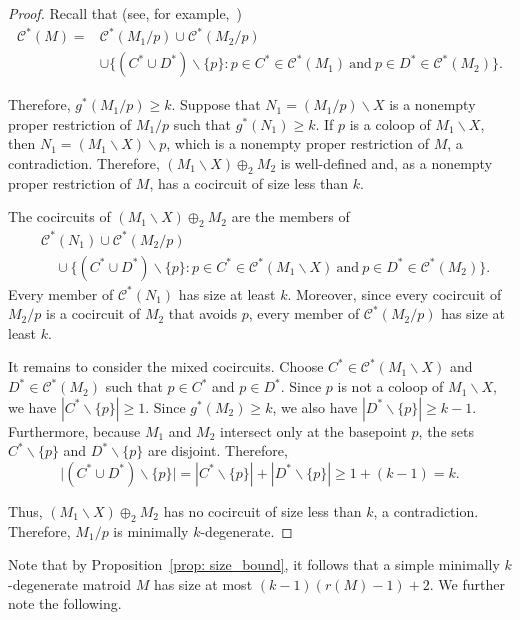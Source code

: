 \documentclass{amsart}
\newcommand{\ba}{\backslash}
\newcommand{\cC}{\mathcal{C}}
\theoremstyle{definition}
\theoremstyle{remark}
\numberwithin{equation}{section}
\begin{document}
\begin{proof}
    Recall that (see, for example,~\cite[Proposition~7.1.20]{Oxl11})
    \begin{align*}
        \cC^*(M)
        ={}&\cC^*(M_1/p)\cup\cC^*(M_2/p)\\
        &\cup\bigl\{(C^*\cup D^*)\backslash\{p\}:
        p\in C^*\in\cC^*(M_1)\ \text{and}\
        p\in D^*\in\cC^*(M_2)\bigr\}.
    \end{align*}

Therefore, $g^*(M_1/p) \geq k$. Suppose that $N_1=(M_1/p)\ba X$ is a nonempty proper restriction of $M_1/p$ such that $g^*(N_1)\geq k$. If $p$ is a coloop of $M_1\ba X$, then $N_1=(M_1\ba X)\ba p$, which is a nonempty proper restriction of $M$, a contradiction. Therefore, $(M_1\ba X)\oplus_2 M_2$ is well-defined and, as a nonempty proper restriction of $M$, has a cocircuit of size less than $k$.

    The cocircuits of $(M_1\ba X)\oplus_2 M_2$ are the members of
    \begin{align*}
        &\cC^*(N_1)\cup\cC^*(M_2/p)\\
        &\quad\cup\bigl\{(C^*\cup D^*)\backslash\{p\}:
        p\in C^*\in\cC^*(M_1\ba X)\ \text{and}\
        p\in D^*\in\cC^*(M_2)\bigr\}.
    \end{align*}
    Every member of $\cC^*(N_1)$ has size at least $k$. Moreover, since every cocircuit of $M_2/p$ is a cocircuit of $M_2$ that avoids $p$, every member of $\cC^*(M_2/p)$ has size at least $k$.


    It remains to consider the mixed cocircuits. Choose $C^*\in \cC^*(M_1\ba X)$ and $D^*\in \cC^*(M_2)$ such that $p \in C^*$ and $p \in D^*$. Since $p$ is not a coloop of $M_1\ba X$, we have $|C^*\backslash\{p\}|\geq 1$. Since $g^*(M_2)\geq k$, we also have $|D^*\backslash\{p\}|\geq k-1$. Furthermore, because $M_1$ and $M_2$ intersect only at the basepoint $p$, the sets $C^*\backslash\{p\}$ and $D^*\backslash\{p\}$ are disjoint. Therefore,
    \[
        \bigl|(C^*\cup D^*)\backslash\{p\}\bigr| = |C^*\backslash\{p\}| + |D^*\backslash\{p\}| \geq 1+(k-1)=k.
    \]
    
    Thus, $(M_1\ba X)\oplus_2 M_2$ has no cocircuit of size less than $k$, a contradiction. Therefore, $M_1/p$ is minimally $k$-degenerate.
\end{proof}



Note that by Proposition~\ref{prop: size_bound}, it follows that a simple minimally $k$-degenerate matroid $M$ has size at most $(k-1)(r(M)-1)+2$.
We further note the following.
\end{document}
